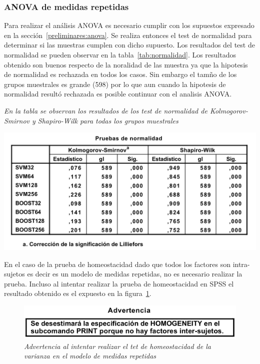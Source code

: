 \subsubsection{ANOVA de medidas repetidas}

Para realizar el análisis ANOVA es necesario cumplir con los supuestos expresado en la sección~\ref{preliminares:anova}. Se realiza entonces el test de normalidad para determinar si las muestras cumplen con dicho supuesto. Los resultados del test de normalidad se pueden observar en la tabla~\ref{tab:normalidad}. Los resultados obtenido son buenos respecto de la noralidad de las muestra ya que la hipotesis de normalidad es rechazada en todos los casos. Sin embargo el tamño de los grupos muestrales es grande (598) por lo que aun cuando la hipotesis de normalidad resultó rechazada es posible continuar con el analisis ANOVA.

\begin{table}[htc]
  \centering
  \caption{\em En la tabla se observan los resultados de los test de normalidad de Kolmogorov-Smirnov y Shapiro-Wilk para todas los grupos muestrales}  
  \label{tab:normalidad}
  \includegraphics[scale=.3]{images/normalidad}
\end{table}

En el caso de la prueba de homeostacidad dado que todos los factores son intra-sujetos es decir es un modelo de medidas repetidas, no es necesario realizar la prueba. Incluso al intentar realizar la prueba de homeostacidad en SPSS el resultado obtenido es el expuesto en la figura~\ref{fig:homeo}. 

\begin{figure}[htc]
  \centering
  \includegraphics[scale=.3]{images/homeo}
  \caption{\em  Advertencia al intentar realizar el tet de homeostacidad de la varianza en el modelo de medidas repetidas}  
  \label{fig:homeo}
\end{figure}

